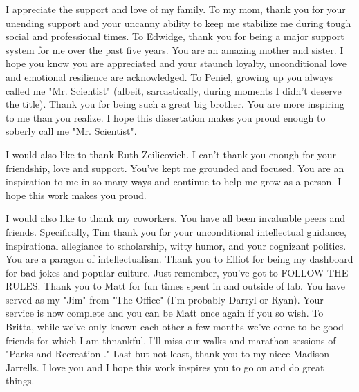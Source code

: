 \documentclass[phd,tocprelim]{cornell}
\begin{document}
\begin{acknowledgements}
I appreciate the support and love of my family. To my mom, thank you for your unending support and your uncanny ability to keep me stabilize me during tough social and professional times. To Edwidge, thank you for being a major support system for me over the past five years. You are an amazing mother and sister. I hope you know you are appreciated and your staunch loyalty, unconditional love and emotional resilience are acknowledged. To Peniel, growing up you always called me "Mr. Scientist" (albeit, sarcastically, during moments I didn't deserve the title). Thank you for being such a great big brother. You are more inspiring to me than you realize. I hope this dissertation makes you proud enough to soberly call me "Mr. Scientist".

I would also like to thank Ruth Zeilicovich. I can't thank you enough for your friendship, love and support. You've kept me grounded and focused. You are an inspiration to me in so many ways and continue to help me grow as a person. I hope this work makes you proud. 

I would also like to thank my coworkers. You have all been invaluable peers and friends. Specifically, Tim thank you for your unconditional intellectual guidance, inspirational allegiance to scholarship, witty humor, and your cognizant politics. You are a paragon of intellectualism. Thank you to Elliot for being my dashboard for bad jokes and popular culture. Just remember, you've got to FOLLOW THE RULES. Thank you to Matt for fun times spent in and outside of lab. You have served as my "Jim" from "The Office" (I'm probably Darryl or Ryan). Your service is now complete and you can be Matt once again if you so wish. To Britta, while we've only known each other a few months we've come to be good friends for which I am thnankful. I'll miss our walks and marathon sessions of "Parks and Recreation ." Last but not least, thank you to my niece Madison Jarrells. I love you and I hope this work inspires you to go on and do great things. 

\end{acknowledgements}


\contentspage

\tablelistpage

\figurelistpage



\normalspacing \setcounter{page}{1} 

\pagestyle{cornell} \addtolength{\parskip}{0.5\baselineskip}
\end{document}
